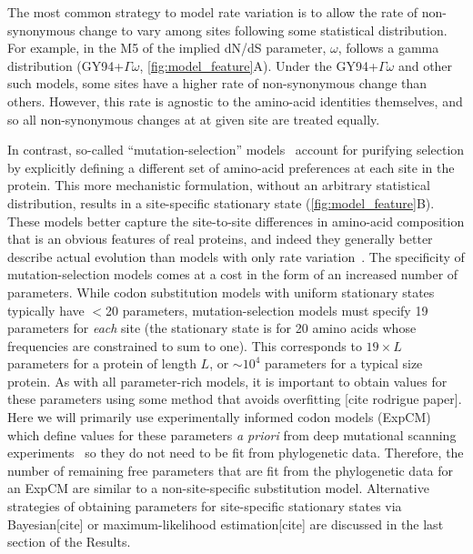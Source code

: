\documentclass[11pt]{article}
\newcommand\skhcomment[1]{{\color{cyan}[#1]}}
\begin{document}
The most common strategy to model rate variation is to allow the rate of non-synonymous change to vary among sites following some statistical distribution.
For example, in the M5 of \cite{yang2000codon} the implied dN/dS parameter, $\omega$, follows a gamma distribution (GY94+$\Gamma\omega$, \ref{fig:model_feature}A).
Under the GY94+$\Gamma\omega$ and other such models, some sites have a higher rate of non-synonymous change than others. 
However, this rate is agnostic to the amino-acid identities themselves, and so all non-synonymous changes at at given site are treated equally. 

In contrast, so-called ``mutation-selection'' models~\citep{halpern1998evolutionary} account for purifying selection by explicitly defining a different set of amino-acid preferences at each site in the protein. 
This more mechanistic formulation, without an arbitrary statistical distribution, results in a site-specific stationary state (\ref{fig:model_feature}B). 
These models better capture the site-to-site differences in amino-acid composition that is an obvious features of real proteins, and indeed they generally better describe actual evolution than models with only rate variation~\citep{lartillot2004bayesian, le2008phylogenetic, rodrigue2010mutation,hilton2017phydms,bloom2014experimentally}.
The specificity of mutation-selection models comes at a cost in the form of an increased number of parameters. 
While codon substitution models with uniform stationary states typically have $<$20 parameters, mutation-selection models must specify 19 parameters for \emph{each} site (the stationary state is for 20 amino acids whose frequencies are constrained to sum to one).
This corresponds to $19\times L$ parameters for a protein of length $L$, or $\sim 10^4$ parameters for a typical size protein.
As with all parameter-rich models, it is important to obtain values for these parameters using some method that avoids overfitting \skhcomment{cite rodrigue paper}.
Here we will primarily use experimentally informed codon models (ExpCM)~\citep{bloom2014experimentally, hilton2017phydms, bloom2017identification} which define values for these parameters \textit{a priori} from deep mutational scanning experiments~\citep{araya2011,fowler2010high} so they do not need to be fit from phylogenetic data.
Therefore, the number of remaining free parameters that are fit from the phylogenetic data for an ExpCM are similar to a non-site-specific substitution model.
Alternative strategies of obtaining parameters for site-specific stationary states via Bayesian\skhcomment{cite} or maximum-likelihood estimation\skhcomment{cite} are discussed in the last section of the Results.
\end{document}
